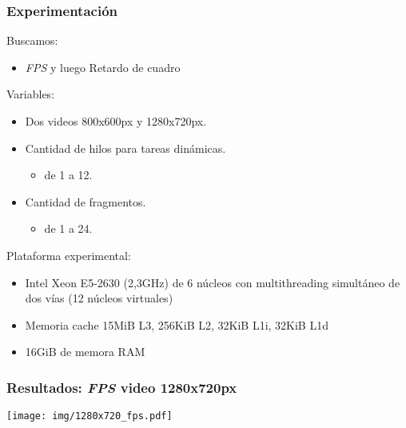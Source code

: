 \documentclass[11pt,a4paper,spanish]{beamer}
\begin{document}
\begin{frame}

\frametitle{Experimentación}

Buscamos:

\begin{itemize}

	\item \emph{FPS} y luego Retardo de cuadro

\end{itemize}

Variables:

\begin{itemize}

        \item Dos videos 800x600px y 1280x720px.

        \item Cantidad de hilos para tareas dinámicas.

	\begin{itemize}

        \item de 1 a 12.

	\end{itemize}

	\item Cantidad de fragmentos.

	\begin{itemize}

        	\item de 1 a 24.

	\end{itemize}

\end{itemize}

Plataforma experimental:

\begin{itemize}

	\item Intel Xeon E5-2630 (2,3GHz) de 6 núcleos con multithreading
		simultáneo de dos vías (12 núcleos virtuales)

	\item Memoria cache 15MiB L3, 256KiB L2, 32KiB L1i, 32KiB L1d

	\item 16GiB de memora RAM

\end{itemize}

\end{frame}

\begin{frame}

\frametitle{Resultados: \emph{FPS} video 1280x720px}

\texttt{[image: img/1280x720\_fps.pdf]}

\end{frame}
\end{document}
